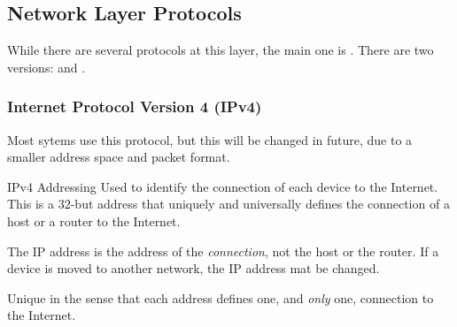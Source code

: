 \documentclass[\main/notes.tex]{subfiles}
\begin{document}
			\subsection{Network Layer Protocols}
				While there are several protocols at this layer, the main one is . There are two versions:  and .
				\subsubsection{Internet Protocol Version 4 (IPv4)}
					Most sytems use this protocol, but this will be changed in future, due to a smaller address space and packet format.
					\begin{definition}{IPv4 Addressing}
						Used to identify the connection of each device to the Internet. This is a $32$-but address that uniquely and universally defines the connection of a host or a router to the Internet.

						The IP address is the address of the \emph{connection}, not the host or the router. If a device is moved to another network, the IP address mat be changed.

						Unique in the sense that each address defines one, and \emph{only} one, connection to the Internet.


\end{definition}
\end{document}
